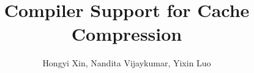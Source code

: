 \documentclass[10pt,twocolumn]{article}
\begin{document}
\title{\bf Compiler Support for Cache Compression}
\author{Hongyi Xin, Nandita Vijaykumar, Yixin Luo}
\date{}
\maketitle
\thispagestyle{empty}














 
\end{document}
